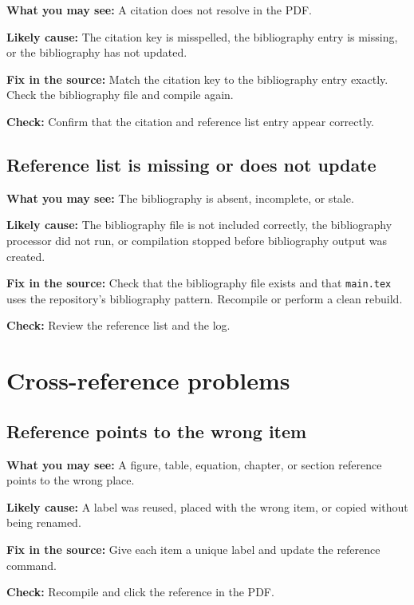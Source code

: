 \textbf{What you may see:} A citation does not resolve in the PDF.

\textbf{Likely cause:} The citation key is misspelled, the bibliography entry is missing, or the bibliography has not updated.

\textbf{Fix in the source:} Match the citation key to the bibliography entry exactly. Check the bibliography file and compile again.

\textbf{Check:} Confirm that the citation and reference list entry appear correctly.

\subsection{Reference list is missing or does not update}
\label{subsec:reference-list-missing}

\textbf{What you may see:} The bibliography is absent, incomplete, or stale.

\textbf{Likely cause:} The bibliography file is not included correctly, the bibliography processor did not run, or compilation stopped before bibliography output was created.

\textbf{Fix in the source:} Check that the bibliography file exists and that \texttt{main.tex} uses the repository's bibliography pattern. Recompile or perform a clean rebuild.

\textbf{Check:} Review the reference list and the log.

\section{Cross-reference problems}
\label{sec:cross-reference-problems}

\subsection{Reference points to the wrong item}
\label{subsec:reference-wrong-item}

\textbf{What you may see:} A figure, table, equation, chapter, or section reference points to the wrong place.

\textbf{Likely cause:} A label was reused, placed with the wrong item, or copied without being renamed.

\textbf{Fix in the source:} Give each item a unique label and update the reference command.

\textbf{Check:} Recompile and click the reference in the PDF.

